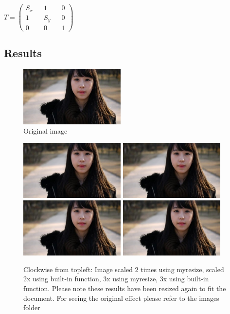 \documentclass[paper=a4, fontsize=11pt]{scrartcl} %
\numberwithin{equation}{section} %
\numberwithin{figure}{section} %
\numberwithin{table}{section} %
\begin{document}
\(
  T = 
  \begin{pmatrix}
    S_x && 1 && 0 \\
    1 && S_y && 0 \\
    0 && 0 && 1
  \end{pmatrix}
\) 

\subsection{Results}
  \begin{figure}[h!]
    \centering
    \includegraphics[clip,height=3cm]{1}
    \caption{Original image}
  \end{figure}

  \begin{figure}[h!]   
    \centering
    \includegraphics[clip,height=3cm]{resized2x}
    \includegraphics[clip,height=3cm]{scvresized2x}
    \includegraphics[clip,height=3cm]{resized3x}
    \includegraphics[clip,height=3cm]{scvresized3x}
    \caption{Clockwise from topleft: Image scaled 2 times using myresize, scaled 2x using built-in function, 3x using myresize, 3x using built-in function. Please note these results have been resized again to fit the document. For seeing the original effect please refer to the images folder}
  \end{figure}
  
\end{document}
